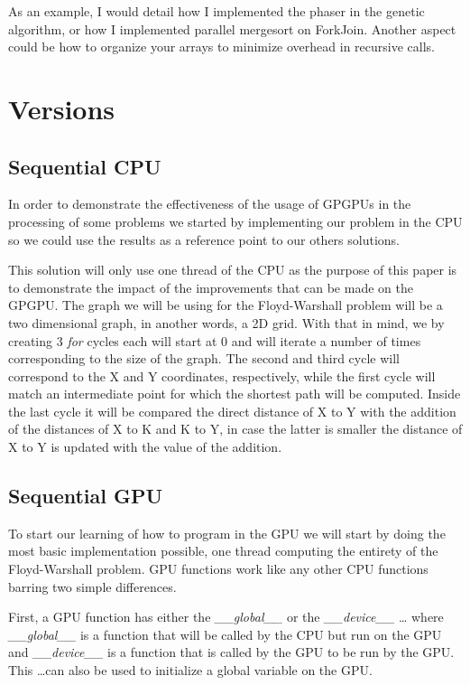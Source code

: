 \documentclass[runningheads]{llncs}
\begin{document}
As an example, I would detail how I implemented the phaser in the genetic algorithm, or how I implemented parallel mergesort on ForkJoin. Another aspect could be how to organize your arrays to minimize overhead in recursive calls.

\section{Versions}
\subsection{Sequential CPU}
In order to demonstrate the effectiveness of the usage of GPGPUs in the processing 
of some problems we started by implementing our problem in the CPU so we could use the results as a reference point to our others solutions.

This solution will only use one thread of the CPU as the purpose of this paper is to demonstrate the impact of the improvements that can be made on the GPGPU.
The graph we will be using for the Floyd-Warshall problem will be a two dimensional graph, in another words, a 2D grid.
With that in mind, we by creating 3 \textit{for} cycles each will start at 0 and will iterate a number of times corresponding to the size of the graph.
The second and third cycle will correspond to the X and Y coordinates, respectively, 
while the first cycle will match an intermediate point for which the shortest path will be computed.
Inside the last cycle it will be compared the direct distance of X to Y with the addition of the distances 
of X to K and K to Y, in case the latter is smaller the distance of X to Y is updated with the value of the addition.

\subsection{Sequential GPU}
To start our learning of how to program in the GPU we will start by doing the most basic implementation possible, 
one thread computing the entirety of the Floyd-Warshall problem.
GPU functions work like any other CPU functions barring two simple differences. 

First, a GPU function has either the \textit{\_\_global\_\_} or the \textit{\_\_device\_\_} \dots%
where \textit{\_\_global\_\_} is a function that will be called by the CPU but run on the GPU 
and \textit{\_\_device\_\_} is a function that is called by the GPU to be run by the GPU. 
This \dots can also be used to initialize a global variable on the GPU.
\end{document}
